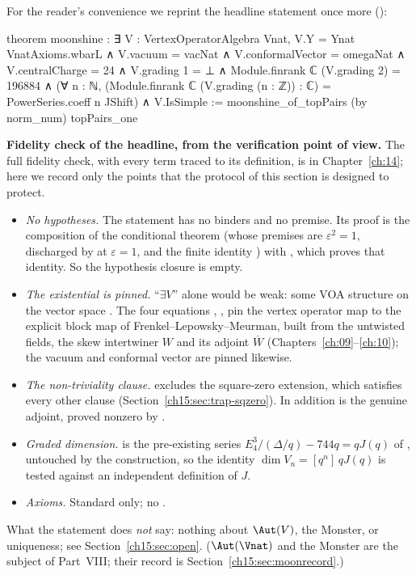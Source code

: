 For the reader's convenience we reprint the headline statement once more
():
\begin{leancode}
theorem moonshine :
    ∃ V : VertexOperatorAlgebra Vnat,
      V.Y = Ynat VnatAxioms.wbarL ∧ V.vacuum = vacNat ∧ V.conformalVector = omegaNat ∧
      V.centralCharge = 24 ∧
      V.grading 1 = ⊥ ∧
      Module.finrank ℂ (V.grading 2) = 196884 ∧
      (∀ n : ℕ, (Module.finrank ℂ (V.grading (n : ℤ)) : ℂ) = PowerSeries.coeff n JShift) ∧
      V.IsSimple :=
  moonshine_of_topPairs (by norm_num) topPairs_one
\end{leancode}

\begin{dictionary}
\textbf{Fidelity check of the headline, from the verification point of view.} The full fidelity
check, with every term traced to its definition, is in Chapter~\ref{ch:14}; here we record only the
points that the protocol of this section is designed to protect.
\begin{itemize}
\item \emph{No hypotheses.} The statement has no binders and no premise. Its proof is the
  composition of the conditional theorem  (whose premises are
  $\varepsilon^2=1$, discharged by  at $\varepsilon=1$, and the finite identity
  ) with , which proves that identity. So the hypothesis closure is
  empty.
\item \emph{The existential is pinned.} ``$\exists V$'' alone would be weak: some VOA structure on
  the vector space . The four equations ,
  ,  pin the vertex operator map to the
  explicit block map of Frenkel--Lepowsky--Meurman, built from the untwisted fields, the skew
  intertwiner $W$ and its adjoint $\overline W$ (Chapters~\ref{ch:09}--\ref{ch:10}); the vacuum and
  conformal vector are pinned likewise.
\item \emph{The non-triviality clause.}  excludes the square-zero extension, which
  satisfies every other clause (Section~\ref{ch15:sec:trap-sqzero}). In addition  is the
  genuine adjoint, proved nonzero by .
\item \emph{Graded dimension.}  is the pre-existing series $E_4^3/(\Delta/q)-744q=qJ(q)$
  of , untouched by the construction, so the identity
  $\dim V_n=[q^n]\,qJ(q)$ is tested against an independent definition of $J$.
\item \emph{Axioms.} Standard only; no .
\end{itemize}
What the statement does \emph{not} say: nothing about $\Aut(V)$, the Monster, or uniqueness;
see Section~\ref{ch15:sec:open}. ($\Aut(\Vnat)$ and the Monster are the subject of Part~VIII; their record is
Section~\ref{ch15:sec:moonrecord}.)
\end{dictionary}

